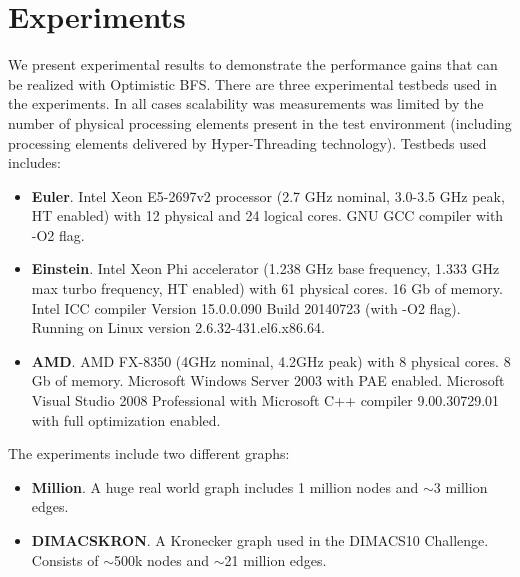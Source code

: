 \documentclass[letterpaper]{article}
\begin{document}
	
	
	\section{Experiments}\label{sec:expe} %
		We present experimental results to demonstrate the performance gains that can be realized with Optimistic BFS.
		There are three experimental testbeds used in the experiments. 
		In all cases scalability was measurements was limited by the number of physical processing elements present in the test environment (including processing elements delivered by Hyper-Threading technology).
		Testbeds used includes:
		\begin{itemize}
			\item \textbf{Euler}. Intel Xeon E5-2697v2 processor (2.7 GHz nominal, 3.0-3.5 GHz peak, HT enabled) with 12 physical and 24 logical cores. GNU GCC compiler with -O2 flag. 
			\item \textbf{Einstein}. Intel Xeon Phi accelerator (1.238 GHz base frequency, 1.333 GHz max turbo frequency, HT enabled) with 61 physical cores. 16 Gb of memory.
			Intel ICC compiler Version 15.0.0.090 Build 20140723 (with -O2 flag).
			Running on Linux version 2.6.32-431.el6.x86.64.

			\item \textbf{AMD}. AMD FX-8350 (4GHz nominal, 4.2GHz peak) with 8 physical cores. 8 Gb of memory. Microsoft Windows Server 2003 with PAE enabled. Microsoft Visual Studio 2008 Professional with  Microsoft C++ compiler 9.00.30729.01 with full optimization enabled.
		\end{itemize}
		The experiments include two different graphs:
		\begin{itemize}
			\item \textbf{Million}. A huge real world graph includes 1 million nodes and $\sim$3 million edges.
			\item \textbf{DIMACSKRON}. A Kronecker graph used in the DIMACS10 Challenge. Consists of $\sim$500k nodes and $\sim$21 million edges.
		\end{itemize}
		


		
\end{document}
